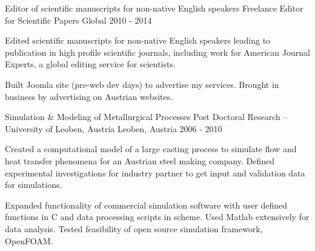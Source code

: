 \begin{cventries}
{    }
  \cventry
    {Editor of scientific manuscripts for non-native English speakers}
    {Freelance Editor for Scientific Papers}
    {Global}
    {2010 - 2014}
    {
      \begin{cvitems}
        \item {Edited scientific manuscripts for non-native English speakers leading to publication in high profile scientific journals, including work for American Journal Experts, a global editing service for scientists.}
        \item {Built Joomla site (pre-web dev days) to advertise my services. Brought in business by advertising on Austrian websites.}
      \end{cvitems}
    }
  \cventry
    {Simulation \& Modeling of Metallurgical Processes}
    {Post Doctoral Research – University of Leoben, Austria}
    {Leoben, Austria}
    {2006 - 2010}
    {
      \begin{cvitems}
        \item {Created a computational model of a large casting process to simulate flow and heat transfer phenomena for an Austrian steel making company. Defined experimental investigations for industry partner to get input and validation data for simulations.}
        \item {Expanded functionality of commercial simulation software with user defined functions in C and data processing scripts in scheme. Used Matlab extensively for data analysis. Tested feasibility of open source simulation framework, OpenFOAM.}
      \end{cvitems}
    }
\end{cventries}
